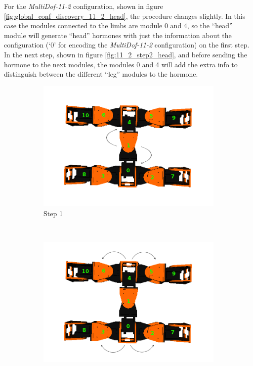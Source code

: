 For the \emph{MultiDof-11-2} configuration, shown in figure \ref{fig:global_conf_discovery_11_2_head}, the procedure changes slightly. In this case the modules connected to the limbs are module 0 and 4, so the ``head'' module will generate ``head'' hormones with just the information about the configuration (`0' for encoding the \emph{MultiDof-11-2} configuration) on the first step. In the next step, shown in figure \ref{fig:11_2_step2_head}, and before sending the hormone to the next modules, the modules 0 and 4 will add the extra info to distinguish between the different ``leg'' modules to the hormone.\\
\begin{figure}[h]
		\centering
        \begin{subfigure}[b]{0.4\textwidth}
                \centering
                \includegraphics[width=\textwidth]{images/Hormone_protocol_11_2_head_step1.png}
                \caption{Step 1}
                \label{fig:11_2_step1_head}
        \end{subfigure}
        ~
        \begin{subfigure}[b]{0.4\textwidth}
                \centering
                \includegraphics[width=\textwidth]{images/Hormone_protocol_11_2_head_step2.png}

\end{subfigure}
\end{figure}
